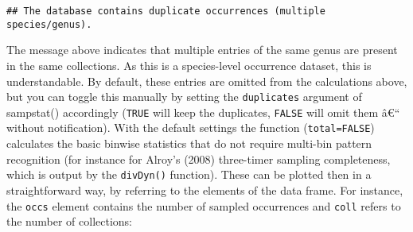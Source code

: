 \documentclass[]{article}
\newenvironment{Shaded}{\begin{snugshade}}{\end{snugshade}}
\newcommand{\CommentTok}[1]{\textcolor[rgb]{0.56,0.35,0.01}{\textit{#1}}}
\newcommand{\DataTypeTok}[1]{\textcolor[rgb]{0.13,0.29,0.53}{#1}}
\newcommand{\DecValTok}[1]{\textcolor[rgb]{0.00,0.00,0.81}{#1}}
\newcommand{\KeywordTok}[1]{\textcolor[rgb]{0.13,0.29,0.53}{\textbf{#1}}}
\newcommand{\NormalTok}[1]{#1}
\newcommand{\OperatorTok}[1]{\textcolor[rgb]{0.81,0.36,0.00}{\textbf{#1}}}
\newcommand{\StringTok}[1]{\textcolor[rgb]{0.31,0.60,0.02}{#1}}
\begin{document}
\begin{verbatim}
## The database contains duplicate occurrences (multiple species/genus).
\end{verbatim}

The message above indicates that multiple entries of the same genus are
present in the same collections. As this is a species-level occurrence
dataset, this is understandable. By default, these entries are omitted
from the calculations above, but you can toggle this manually by setting
the \texttt{duplicates} argument of sampstat() accordingly
(\texttt{TRUE} will keep the duplicates, \texttt{FALSE} will omit them
â€`` without notification). With the default settings the function
(\texttt{total=FALSE}) calculates the basic binwise statistics that do
not require multi-bin pattern recognition (for instance for Alroy's
(2008) three-timer sampling completeness, which is output by the
\texttt{divDyn()} function). These can be plotted then in a
straightforward way, by referring to the elements of the data frame. For
instance, the \texttt{occs} element contains the number of sampled
occurrences and \texttt{coll} refers to the number of collections:

\begin{Shaded}
\end{Shaded}
\end{document}
